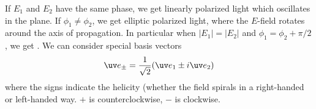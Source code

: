 If $E_1$ and $E_2$ have the same phase, we get linearly polarized light which oscillates in the plane. If $\phi_1 \neq \phi_2$, we get elliptic polarized light, where the $E$-field rotates around the axis of propagation. In particular when $|E_1|=|E_2|$ and $\phi_1 =\phi_2 +\pi/2$, we get . We can consider special basis vectors
\begin{equation}
    \uv e_\pm = \frac{1}{\sqrt{2}}(\uv e_1 \pm i \uv e_2)
\end{equation}
where the signs indicate the helicity (whether the field spirals in a right-handed or left-handed way. $+$ is counterclockwise, $-$ is clockwise.
